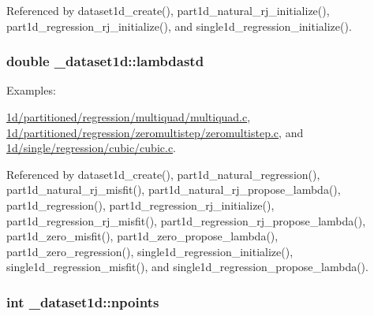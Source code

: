 Referenced by dataset1d\+\_\+create(), part1d\+\_\+natural\+\_\+rj\+\_\+initialize(), part1d\+\_\+regression\+\_\+rj\+\_\+initialize(), and single1d\+\_\+regression\+\_\+initialize().

\subsubsection[{\texorpdfstring{lambdastd}{lambdastd}}]{\setlength{\rightskip}{0pt plus 5cm}double \+\_\+dataset1d\+::lambdastd}\hypertarget{struct__dataset1d_ab5344ed7583036bc0dc1b9e769273c85}{}\label{struct__dataset1d_ab5344ed7583036bc0dc1b9e769273c85}
\begin{Desc}
\item[Examples\+: ]\par
\hyperlink{1d_2partitioned_2regression_2multiquad_2multiquad_8c-example}{1d/partitioned/regression/multiquad/multiquad.\+c}, \hyperlink{1d_2partitioned_2regression_2zeromultistep_2zeromultistep_8c-example}{1d/partitioned/regression/zeromultistep/zeromultistep.\+c}, and \hyperlink{1d_2single_2regression_2cubic_2cubic_8c-example}{1d/single/regression/cubic/cubic.\+c}.\end{Desc}


Referenced by dataset1d\+\_\+create(), part1d\+\_\+natural\+\_\+regression(), part1d\+\_\+natural\+\_\+rj\+\_\+misfit(), part1d\+\_\+natural\+\_\+rj\+\_\+propose\+\_\+lambda(), part1d\+\_\+regression(), part1d\+\_\+regression\+\_\+rj\+\_\+initialize(), part1d\+\_\+regression\+\_\+rj\+\_\+misfit(), part1d\+\_\+regression\+\_\+rj\+\_\+propose\+\_\+lambda(), part1d\+\_\+zero\+\_\+misfit(), part1d\+\_\+zero\+\_\+propose\+\_\+lambda(), part1d\+\_\+zero\+\_\+regression(), single1d\+\_\+regression\+\_\+initialize(), single1d\+\_\+regression\+\_\+misfit(), and single1d\+\_\+regression\+\_\+propose\+\_\+lambda().

\subsubsection[{\texorpdfstring{npoints}{npoints}}]{\setlength{\rightskip}{0pt plus 5cm}int \+\_\+dataset1d\+::npoints}\hypertarget{struct__dataset1d_ab864f8414fd7885ae891e67b615fbb89}{}\label{struct__dataset1d_ab864f8414fd7885ae891e67b615fbb89}


